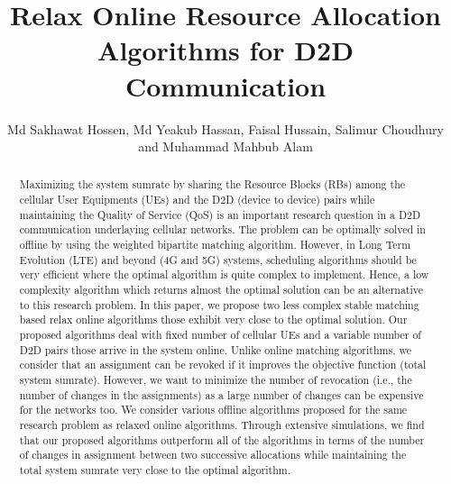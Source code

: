 \documentclass[times]{dacauth}
\begin{document}

\title{Relax Online Resource Allocation Algorithms for D2D Communication}

\author{Md Sakhawat Hossen, Md Yeakub Hassan, Faisal Hussain, Salimur Choudhury and Muhammad Mahbub Alam}

\address{Department of Computer Science and Engineering, IUT, Dhaka, Bangladesh and Department of Computer Science, Lakehead University, Thunder Bay, Ontario, Canada}


\begin{abstract}

\noindent 
Maximizing the system sumrate by sharing the Resource Blocks (RBs) among the cellular User Equipments (UEs) and the D2D (device to device) pairs while maintaining the Quality of Service (QoS) is an important research question in a D2D communication underlaying cellular networks. The problem can be optimally solved in offline by using the weighted bipartite matching algorithm. However, in Long Term Evolution (LTE) and beyond (4G and 5G) systems, scheduling algorithms should be very efficient where the optimal algorithm is quite complex to implement. Hence, a low complexity algorithm which returns almost the optimal solution can be an alternative to this research problem. In this paper, we propose two less complex stable matching based relax online algorithms those exhibit very close to the optimal solution. Our proposed algorithms deal with fixed number of cellular UEs and a variable number of D2D pairs those arrive in the system online. Unlike online matching algorithms, we consider that an assignment can be revoked if it improves the objective function (total system sumrate). However, we want to minimize the number of revocation (i.e., the number of changes in the assignments) as a large number of changes can be expensive for the networks too. We consider various offline algorithms proposed for the same research problem as relaxed online algorithms. Through extensive simulations, we find that our proposed algorithms outperform all of the algorithms in terms of the number of changes in assignment between two successive allocations while maintaining the total system sumrate very close to the optimal algorithm.

\end{abstract}

\end{document}
